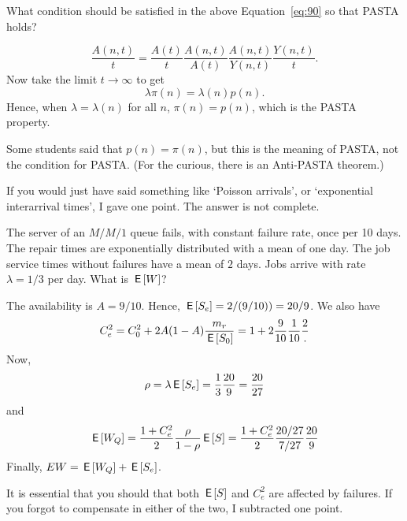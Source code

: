 \begin{exercise}[201704]{2}
  What condition should be satisfied in the above Equation~\eqref{eq:90} so that PASTA holds? 
\begin{solution}
    \begin{equation*}
\frac{A(n,t)}t =  \frac{A(t)}{t} \frac{A(n,t)}{A(t)}   \frac{A(n, t)}{Y(n,t)} \frac{Y(n,t)}{t}.
    \end{equation*}
Now take the limit $t\to \infty$ to get
    \begin{equation*}
\lambda \pi(n) = \lambda(n)p(n).
    \end{equation*}
Hence, when $\lambda=\lambda(n)$ for all $n$, $\pi(n)=p(n)$, which is the PASTA property.


Some students said that $p(n)=\pi(n)$, but this is the meaning of PASTA, not the condition for PASTA. (For the curious, there is an Anti-PASTA theorem.)  

If you would just have said something like `Poisson arrivals', or `exponential interarrival times', I gave one point. The answer is not complete. 
\end{solution}
\end{exercise}

\begin{exercise}[201704]{2}
  The server of an $M/M/1$ queue fails, with constant failure rate, once per 10 days.
  The repair times are exponentially distributed with a mean of one day.
  The job service times without failures have a mean of $2$ days.
  Jobs arrive with rate $\lambda=1/3$ per day.
  What is $\,\mathsf{E}\left[W\right]$?
\begin{solution}
  The availability is $A=9/10$. Hence, $\,\mathsf{E}\left[S_e\right] = 2/(9/10)) = 20/9$. We also have
\begin{equation*}
   C_e^2 = C_0^2 + 2A(1-A)\frac{m_r}{\,\mathsf{E}\left[S_0\right]} = 1 + 2\frac{9}{10}\frac1{10}\frac{2}.
 \end{equation*}
Now,
\begin{equation*}
  \rho = \lambda \,\mathsf{E}\left[S_e\right] = \frac13 \frac{20}9 = \frac{20}{27}
\end{equation*}
and
\begin{equation*}
  \,\mathsf{E}\left[W_Q\right] = \frac{1 + C_e^2}2 \frac{\rho}{1-\rho} \,\mathsf{E}\left[S\right] = \frac{1 + C_e^2}2 \frac{20/27}{7/27} \frac{20}9
\end{equation*}
Finally, $E W = \,\mathsf{E}\left[W_Q\right] + \,\mathsf{E}\left[S_e\right]$.

It is essential that you should that both $\,\mathsf{E}\left[S\right]$ and $C_e^2$ are affected by failures. If you forgot to compensate in either of the two, I subtracted one point. 
\end{solution}
\end{exercise}

